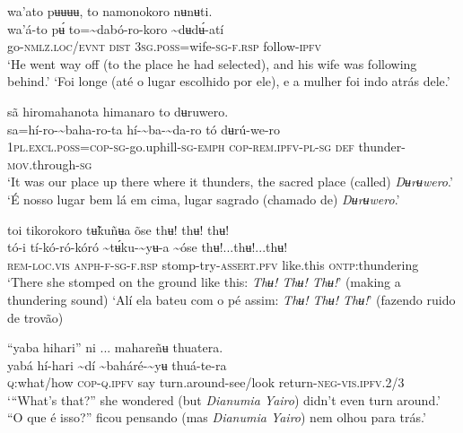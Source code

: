 \documentclass[output=paper,
modfonts,nonflat
]{langsci/langscibook}
\begin{document}
\ea wa'ato pʉʉʉʉ, to namonokoro nʉnʉti. \\[.3em]
\gll wa'á-to	pʉ́	to={\textasciitilde}dabó-ro-koro	{\textasciitilde}dʉdʉ́-atí \\
     go-\textsc{nmlz.loc/evnt}	\textsc{dist}	3\textsc{sg.poss}=wife\textsc{-sg-f.rsp}	follow-\textsc{ipfv} \\
\glt ‘He went way off (to the place he had selected), and his wife was following behind.’
\glt ‘Foi longe (até o lugar escolhido por ele), e a mulher foi indo atrás dele.’
\z

\ea sã hiromahanota himanaro to dʉruwero. \\[.3em]
\gll {\textasciitilde}sa=hí-ro-{\textasciitilde}baha-ro-ta	hí-{\textasciitilde}ba-{\textasciitilde}da-ro	tó	dʉrú-we-ro \\
     1\textsc{pl.excl.poss}=\textsc{cop-sg-}go.uphill\textsc{-sg-emph}	\textsc{cop-rem.ipfv-pl-sg}	\textsc{def}	thunder-\textsc{mov.}through\textsc{-sg}\\
\glt ‘It was our place up there where it thunders, the sacred place (called) \textit{Dʉrʉwero}.’{\footnotemark}
\glt ‘É nosso lugar bem lá em cima, lugar sagrado (chamado de) \textit{Dʉrʉwero}.’
\z 

\ea toi tikorokoro tʉ̃kuñʉa õse thʉ! thʉ! thʉ!  \\[.3em]
\gll tó-i	tí-kó-ró-kóró	{\textasciitilde}tʉ́ku-{\textasciitilde}yʉ-a	{\textasciitilde}óse	thʉ!...thʉ!...thʉ! \\
     \textsc{rem-loc.vis}	\textsc{anph-f-sg-f.rsp} 	stomp-try-\textsc{assert.pfv}	like.this	\textsc{ontp:}thundering\\
\glt ‘There she stomped on the ground like this: \textit{Thʉ! Thʉ! Thʉ!}' (making a thundering sound)
\glt ‘Alí ela bateu com o pé assim: \textit{Thʉ! Thʉ! Thʉ!}' (fazendo ruido de trovão)
\z 

 
\ea “yaba hihari” ni ... mahareñʉ thuatera. \\[.3em]
\gll yabá	hí-hari	{\textasciitilde}dí	{\textasciitilde}baháré{\footnotemark}-{\textasciitilde}yʉ	thuá-te-ra \\
     \textsc{q:}what/how	\textsc{cop-q.ipfv}	say	turn.around-see/look	return\textsc{-neg-vis.ipfv.}2/3\\
\glt ‘“What's that?” she wondered (but \textit{Dianumia Yairo}) didn't even turn around.’
\glt “O que é isso?” ficou pensando (mas \textit{Dianumia Yairo}) nem olhou para trás.’
\z 
\end{document}
